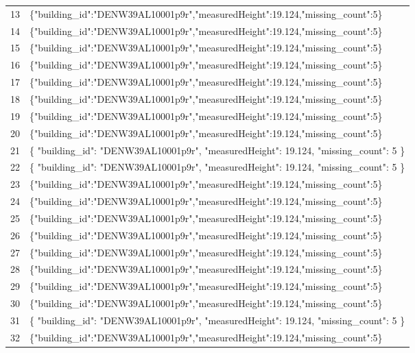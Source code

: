 \documentclass[a4paper,11pt]{article}
\begin{document}
\begin{table}[ht]
\begin{tabular}{r p{12cm}}
13 & \{"building\_id":"DENW39AL10001p9r","measuredHeight":19.124,"missing\_count":5\} \\
14 & \{"building\_id":"DENW39AL10001p9r","measuredHeight":19.124,"missing\_count":5\} \\
15 & \{"building\_id":"DENW39AL10001p9r","measuredHeight":19.124,"missing\_count":5\} \\
16 & \{"building\_id":"DENW39AL10001p9r","measuredHeight":19.124,"missing\_count":5\} \\
17 & \{"building\_id":"DENW39AL10001p9r","measuredHeight":19.124,"missing\_count":5\} \\
18 & \{"building\_id":"DENW39AL10001p9r","measuredHeight":19.124,"missing\_count":5\} \\
19 & \{"building\_id":"DENW39AL10001p9r","measuredHeight":19.124,"missing\_count":5\} \\
20 & \{"building\_id":"DENW39AL10001p9r","measuredHeight":19.124,"missing\_count":5\} \\
21 & \{
  "building\_id": "DENW39AL10001p9r",
  "measuredHeight": 19.124,
  "missing\_count": 5
\} \\
22 & \{
  "building\_id": "DENW39AL10001p9r",
  "measuredHeight": 19.124,
  "missing\_count": 5
\} \\
23 & \{"building\_id":"DENW39AL10001p9r","measuredHeight":19.124,"missing\_count":5\} \\
24 & \{"building\_id":"DENW39AL10001p9r","measuredHeight":19.124,"missing\_count":5\} \\
25 & \{"building\_id":"DENW39AL10001p9r","measuredHeight":19.124,"missing\_count":5\} \\
26 & \{"building\_id":"DENW39AL10001p9r","measuredHeight":19.124,"missing\_count":5\} \\
27 & \{"building\_id":"DENW39AL10001p9r","measuredHeight":19.124,"missing\_count":5\} \\
28 & \{"building\_id":"DENW39AL10001p9r","measuredHeight":19.124,"missing\_count":5\} \\
29 & \{"building\_id":"DENW39AL10001p9r","measuredHeight":19.124,"missing\_count":5\} \\
30 & \{"building\_id":"DENW39AL10001p9r","measuredHeight":19.124,"missing\_count":5\} \\
31 & \{
  "building\_id": "DENW39AL10001p9r",
  "measuredHeight": 19.124,
  "missing\_count": 5
\} \\
32 & \{"building\_id":"DENW39AL10001p9r","measuredHeight":19.124,"missing\_count":5\} \\

\end{tabular}
\end{table}
\end{document}
